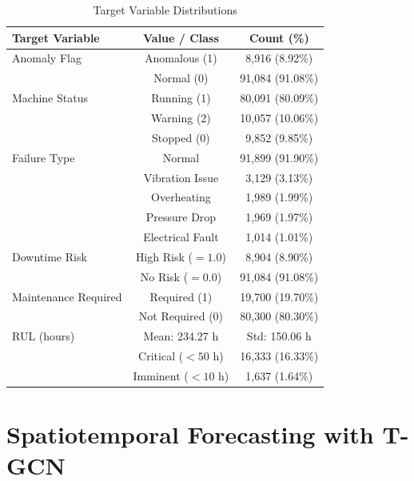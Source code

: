 \begin{table}[htbp]
\centering
\caption{Target Variable Distributions}
\label{tab:target_stats}
\begin{tabular}{lcc}
\hline
\textbf{Target Variable} & \textbf{Value / Class} & \textbf{Count (\%)} \\
\hline
Anomaly Flag         & Anomalous (1)            & 8,916 (8.92\%)  \\
                     & Normal (0)               & 91,084 (91.08\%) \\
\hline
Machine Status       & Running (1)              & 80,091 (80.09\%) \\
                     & Warning (2)              & 10,057 (10.06\%) \\
                     & Stopped (0)              & 9,852 (9.85\%)  \\
\hline
Failure Type         & Normal                   & 91,899 (91.90\%) \\
                     & Vibration Issue          & 3,129 (3.13\%)  \\
                     & Overheating              & 1,989 (1.99\%)  \\
                     & Pressure Drop            & 1,969 (1.97\%)  \\
                     & Electrical Fault         & 1,014 (1.01\%)  \\
\hline
Downtime Risk        & High Risk ($= 1.0$)      & 8,904 (8.90\%)  \\
                     & No Risk ($= 0.0$)        & 91,084 (91.08\%) \\
\hline
Maintenance Required & Required (1)             & 19,700 (19.70\%) \\
                     & Not Required (0)         & 80,300 (80.30\%) \\
\hline
RUL (hours)          & Mean: 234.27 h           & Std: 150.06 h   \\
                     & Critical ($< 50$ h)      & 16,333 (16.33\%) \\
                     & Imminent ($< 10$ h)      & 1,637 (1.64\%)  \\
\hline
\end{tabular}
\end{table}


\section{Spatiotemporal Forecasting with T-GCN}


